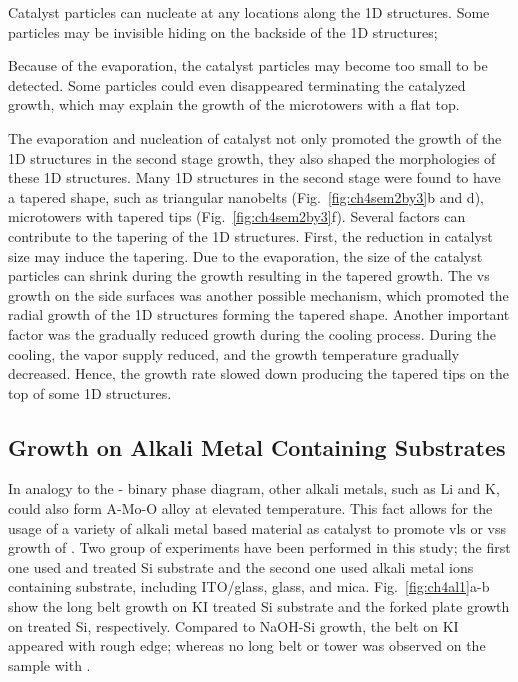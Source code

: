 \begin{enumerate*}[label=\itshape\alph*\upshape)]
\item Catalyst particles can nucleate at any locations along the 1D structures. Some particles may be invisible hiding on the backside of the 1D structures;
\item Because of the evaporation, the catalyst particles may become too small to be detected. Some particles could even disappeared terminating the catalyzed growth, which may explain the growth of the microtowers with a flat top.
\end{enumerate*} The evaporation and nucleation of catalyst not only promoted the growth of the 1D structures in the second stage growth, they also shaped the morphologies of these 1D structures. Many 1D structures in the second stage were found to have a tapered shape, such as triangular nanobelts (Fig.~\ref{fig:ch4sem2by3}b and d), microtowers with tapered tips (Fig.~\ref{fig:ch4sem2by3}f). Several factors can contribute to the tapering of the 1D structures. First, the reduction in catalyst size may induce the tapering. Due to the evaporation, the size of the catalyst particles can shrink during the growth resulting in the tapered growth. The \gls{vs} growth on the side surfaces was another possible mechanism, which promoted the radial growth of the 1D structures forming the tapered shape. Another important factor was the gradually reduced growth during the cooling process. During the cooling, the  vapor supply reduced, and the growth temperature gradually decreased. Hence, the growth rate slowed down producing the tapered tips on the top of some 1D structures.

\subsection{Growth on Alkali Metal Containing Substrates}\label{sec:glass}
In analogy to the - binary phase diagram, other alkali metals, such as Li and K, could also form A-Mo-O alloy at elevated temperature. This fact allows for the usage of a variety of alkali metal based material as catalyst to promote \gls{vls} or \gls{vss} growth of . Two group of experiments have been performed in this study; the first one used  and  treated Si substrate and the second one used alkali metal ions containing substrate, including ITO/glass, glass, and mica. Fig.~\ref{fig:ch4al1}a-b show the long belt growth on KI treated Si substrate and the forked plate growth on  treated Si, respectively. Compared to NaOH-Si growth, the belt on KI appeared with rough edge; whereas no long belt or tower was observed on the sample with . 

